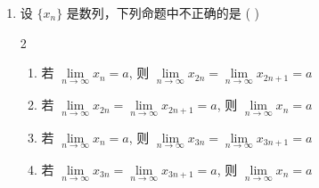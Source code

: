 \begin{enumerate}[label=\textbf{\arabic*.}, itemsep=3cm]
    \item 设 $\{x_n\}$ 是数列，下列命题中不正确的是 ( \quad )
    \begin{multicols}{2}
    \begin{enumerate}[label=(\Alph*)]
        \item 若 $\lim\limits_{n \to \infty} x_n = a$, 则 $\lim\limits_{n \to \infty} x_{2n} = \lim\limits_{n \to \infty} x_{2n+1} = a$
        \item 若 $\lim\limits_{n \to \infty} x_{2n} = \lim\limits_{n \to \infty} x_{2n+1} = a$, 则 $\lim\limits_{n \to \infty} x_n = a$
        \item 若 $\lim\limits_{n \to \infty} x_n = a$, 则 $\lim\limits_{n \to \infty} x_{3n} = \lim\limits_{n \to \infty} x_{3n+1} = a$
        \item 若 $\lim\limits_{n \to \infty} x_{3n} = \lim\limits_{n \to \infty} x_{3n+1} = a$, 则 $\lim\limits_{n \to \infty} x_n = a$
    \end{enumerate}
    \end{multicols}

\end{enumerate}

\newpage

